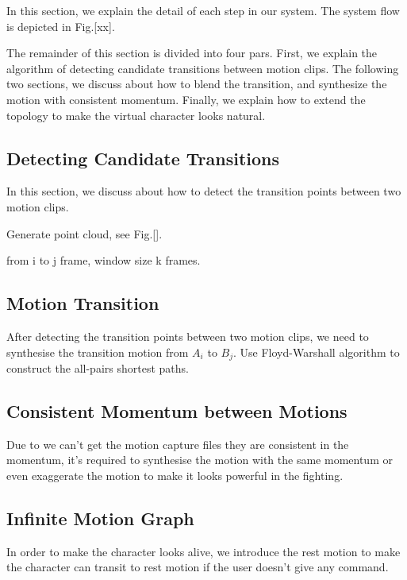 In this section, we explain the detail of each step in our system. The system 
flow is depicted in Fig.[xx]. 

The remainder of this section is divided into four pars. 
First, we explain the algorithm of detecting candidate transitions between 
motion clips. The following two sections, we discuss about how to blend the 
transition, and synthesize the motion with consistent momentum.
Finally, we explain how to extend the topology to make the virtual character 
looks natural.


\subsection{Detecting Candidate Transitions}
In this section, we discuss about how to detect the transition points between two 
motion clips. 

Generate point cloud, see Fig.[]. 

from i to j frame, window size k frames.


\subsection{Motion Transition}
After detecting the transition points between two motion clips, we need to 
synthesise the transition motion from $A_i$ to $B_j$. 
Use Floyd-Warshall algorithm to construct the all-pairs shortest paths. 



\subsection{Consistent Momentum between Motions}
Due to we can't get the motion capture files they are consistent in the 
momentum, it's required to synthesise the motion with the same momentum or even 
exaggerate the motion to make it looks powerful in the fighting.


\subsection{Infinite Motion Graph}
In order to make the character looks alive, we introduce the rest motion to make 
the character can transit to rest motion if the user doesn't give any command.

